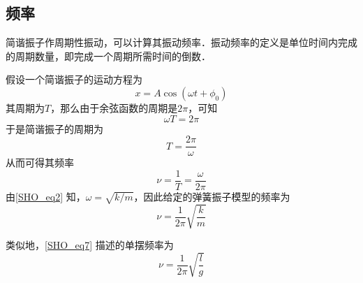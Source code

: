 \subsection{频率}

简谐振子作周期性振动，可以计算其振动频率．振动频率的定义是单位时间内完成的周期数量，即完成一个周期所需时间的倒数．

假设一个简谐振子的运动方程为
\begin{equation}
x = A\cos(\omega t+\phi_0)
\end{equation}
其周期为$T$，那么由于余弦函数的周期是$2\pi$，可知
\begin{equation}
\omega T = 2\pi
\end{equation}
于是简谐振子的周期为
\begin{equation}
T = \frac{2\pi}{\omega}
\end{equation}
从而可得其频率
\begin{equation}
\nu = \frac{1}{T} = \frac{\omega}{2\pi}
\end{equation}
由\autoref{SHO_eq2} 知，$\omega=\sqrt{k/m}$，因此给定的弹簧振子模型的频率为
\begin{equation}
\nu = \frac{1}{2\pi}\sqrt{\frac{k}{m}}
\end{equation}

类似地，\autoref{SHO_eq7} 描述的单摆频率为
\begin{equation}
\nu = \frac{1}{2\pi}\sqrt{\frac{l}{g}}
\end{equation}














